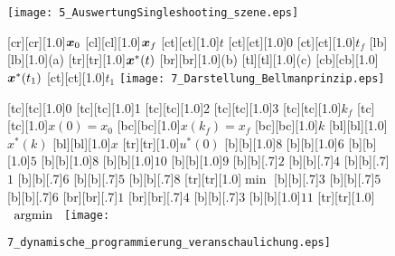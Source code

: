 \begin{figure}[h]
	\centering
	
	\renewcommand{\matlabtextA}{\scriptsize}
	\texttt{[image: 5\_AuswertungSingleshooting\_szene.eps]}		
    \label{fig:fussgaenger_draufsicht}
\end{figure}
	
	
\begin{figure}[h]
	[cr][cr][1.0]{$\boldsymbol{x}_0$}
	[cl][cl][1.0]{$\boldsymbol{x}_f$}
	[ct][ct][1.0]{$t$}
	[ct][ct][1.0]{$0$}
	[ct][ct][1.0]{$t_f$}
	[lb][lb][1.0]{(a)}
	[tr][tr][1.0]{$\boldsymbol{x}^\ast(t)$}
	[br][br][1.0]{(b)}
	[tl][tl][1.0]{(c)}
	[cb][cb][1.0]{$\boldsymbol{x}^\ast(t_1)$}
	[ct][ct][1.0]{$t_1$}
	\centering
 \texttt{[image: 7\_Darstellung\_Bellmanprinzip.eps]}
	\label{fig:Darstellung_Bellmanprinzip}
\end{figure} 

\begin{figure}[h]
	[tc][tc][1.0]{0}
	[tc][tc][1.0]{1}
	[tc][tc][1.0]{2}
	[tc][tc][1.0]{3}
	[tc][tc][1.0]{$k_f$}
	[tc][tc][1.0]{$x(0) = x_0$}
	[bc][bc][1.0]{$x(k_f) = x_f$}
	[bc][bc][1.0]{$k$}
	[bl][bl][1.0]{$x^\ast(k)$}
	[bl][bl][1.0]{$x$}
	[tr][tr][1.0]{$u^\ast(0)$}
	[b][1.0]{$8$}
	[b][1.0]{$6$}
	[b][1.0]{$5$}
	[b][1.0]{$8$}
	[b][1.0]{$10$}
	[b][1.0]{$9$}
	[b][.7]{$2$}
	[b][.7]{$4$}
	[b][.7]{$1$}
	[b][.7]{$6$}
	[b][.7]{$5$}
	[b][.7]{$8$}
	[tr][tr][1.0]{$\min$}
	[b][.7]{$3$}
	[b][.7]{$5$}
	[b][.7]{$6$}
	[br][br][.7]{$1$}
	[br][br][.7]{$4$}
	[b][.7]{$3$}
	[b][1.0]{$11$}
	[tr][tr][1.0]{$\argmin{}$}
	\centering
  	\texttt{[image: 7\_dynamische\_programmierung\_veranschaulichung.eps]}
	\label{fig:dynamische_programmierung_veranschaulichung}
\end{figure} 

